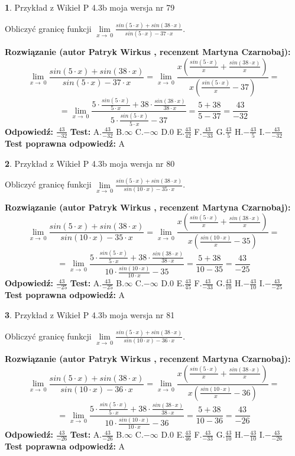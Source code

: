 \documentclass[12pt, a4paper]{article}
\theoremstyle{definition} %
\newtheorem{zad}{}
\newcommand{\zadStart}[1]{\begin{zad}#1\newline}
\newcommand{\zadStop}{\end{zad}}
\newcommand{\rozwStart}[2]{\noindent \textbf{Rozwiązanie (autor #1 , recenzent #2): }\newline}
\newcommand{\rozwStop}{\newline}
\newcommand{\odpStart}{\noindent \textbf{Odpowiedź:}\newline}
\newcommand{\odpStop}{\newline}
\newcommand{\testStart}{\noindent \textbf{Test:}\newline}
\newcommand{\testStop}{\newline}
\newcommand{\kluczStart}{\noindent \textbf{Test poprawna odpowiedź:}\newline}
\newcommand{\kluczStop}{\newline}
\begin{document}
\zadStart{Przykład z Wikieł P 4.3b moja wersja nr 79}


Obliczyć granicę funkcji $\lim\limits_{x\to\ 0}\frac{sin(5 \cdot x)+sin(38 \cdot x)}{sin(5 \cdot x)-37 \cdot x}$.
\zadStop
\rozwStart{Patryk Wirkus}{Martyna Czarnobaj}
$$\lim\limits_{x\to\ 0}\frac{sin(5 \cdot x)+sin(38 \cdot x)}{sin(5 \cdot x)-37 \cdot x}=\lim\limits_{x\to\ 0}\frac{x(\frac{sin(5 \cdot x)}{x}+\frac{sin(38 \cdot x)}{x})}{x(\frac{sin(5 \cdot x)}{x}-37)}=$$
$$=\lim\limits_{x\to\ 0}\frac{5 \cdot \frac{sin(5 \cdot x)}{5 \cdot x}+38 \cdot \frac{sin(38 \cdot x)}{38 \cdot x}}{5 \cdot \frac{sin(5 \cdot x)}{5 \cdot x}-37}=\frac{5+38}{5-37} = \frac{43}{-32}$$
\rozwStop
\odpStart
$\frac{43}{-32}$
\odpStop
\testStart
A.$\frac{43}{-32}$
B.$\infty$
C.$-\infty$
D.$0$
E.$\frac{43}{42}$
F.$\frac{43}{-33}$
G.$\frac{43}{5}$
H.$-\frac{43}{5}$
I.$-\frac{43}{-32}$
\testStop
\kluczStart
A
\kluczStop



\zadStart{Przykład z Wikieł P 4.3b moja wersja nr 80}


Obliczyć granicę funkcji $\lim\limits_{x\to\ 0}\frac{sin(5 \cdot x)+sin(38 \cdot x)}{sin(10 \cdot x)-35 \cdot x}$.
\zadStop
\rozwStart{Patryk Wirkus}{Martyna Czarnobaj}
$$\lim\limits_{x\to\ 0}\frac{sin(5 \cdot x)+sin(38 \cdot x)}{sin(10 \cdot x)-35 \cdot x}=\lim\limits_{x\to\ 0}\frac{x(\frac{sin(5 \cdot x)}{x}+\frac{sin(38 \cdot x)}{x})}{x(\frac{sin(10 \cdot x)}{x}-35)}=$$
$$=\lim\limits_{x\to\ 0}\frac{5 \cdot \frac{sin(5 \cdot x)}{5 \cdot x}+38 \cdot \frac{sin(38 \cdot x)}{38 \cdot x}}{10 \cdot \frac{sin(10 \cdot x)}{10 \cdot x}-35}=\frac{5+38}{10-35} = \frac{43}{-25}$$
\rozwStop
\odpStart
$\frac{43}{-25}$
\odpStop
\testStart
A.$\frac{43}{-25}$
B.$\infty$
C.$-\infty$
D.$0$
E.$\frac{43}{45}$
F.$\frac{43}{-33}$
G.$\frac{43}{10}$
H.$-\frac{43}{10}$
I.$-\frac{43}{-25}$
\testStop
\kluczStart
A
\kluczStop



\zadStart{Przykład z Wikieł P 4.3b moja wersja nr 81}


Obliczyć granicę funkcji $\lim\limits_{x\to\ 0}\frac{sin(5 \cdot x)+sin(38 \cdot x)}{sin(10 \cdot x)-36 \cdot x}$.
\zadStop
\rozwStart{Patryk Wirkus}{Martyna Czarnobaj}
$$\lim\limits_{x\to\ 0}\frac{sin(5 \cdot x)+sin(38 \cdot x)}{sin(10 \cdot x)-36 \cdot x}=\lim\limits_{x\to\ 0}\frac{x(\frac{sin(5 \cdot x)}{x}+\frac{sin(38 \cdot x)}{x})}{x(\frac{sin(10 \cdot x)}{x}-36)}=$$
$$=\lim\limits_{x\to\ 0}\frac{5 \cdot \frac{sin(5 \cdot x)}{5 \cdot x}+38 \cdot \frac{sin(38 \cdot x)}{38 \cdot x}}{10 \cdot \frac{sin(10 \cdot x)}{10 \cdot x}-36}=\frac{5+38}{10-36} = \frac{43}{-26}$$
\rozwStop
\odpStart
$\frac{43}{-26}$
\odpStop
\testStart
A.$\frac{43}{-26}$
B.$\infty$
C.$-\infty$
D.$0$
E.$\frac{43}{46}$
F.$\frac{43}{-33}$
G.$\frac{43}{10}$
H.$-\frac{43}{10}$
I.$-\frac{43}{-26}$
\testStop
\kluczStart
A
\kluczStop
\end{document}

